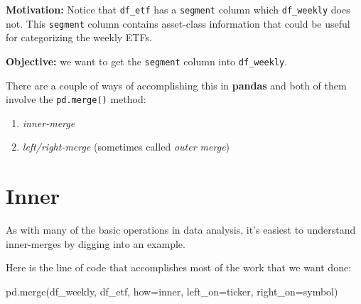 \documentclass[
  letterpaper,
  DIV=11,
  numbers=noendperiod]{scrreprt}
\newenvironment{Shaded}{\begin{snugshade}}{\end{snugshade}}
\newcommand{\NormalTok}[1]{\textcolor[rgb]{0.00,0.23,0.31}{#1}}
\newcommand{\OperatorTok}[1]{\textcolor[rgb]{0.37,0.37,0.37}{#1}}
\newcommand{\StringTok}[1]{\textcolor[rgb]{0.13,0.47,0.30}{#1}}
\begin{document}
\textbf{Motivation:} Notice that \texttt{df\_etf} has a \texttt{segment}
column which \texttt{df\_weekly} does not. This \texttt{segment} column
contains asset-class information that could be useful for categorizing
the weekly ETFs.

\textbf{Objective:} we want to get the \texttt{segment} column into
\texttt{df\_weekly}.

There are a couple of ways of accomplishing this in \textbf{pandas} and
both of them involve the \texttt{pd.merge()} method:

\begin{enumerate}
\def\labelenumi{\arabic{enumi}.}
\item
  \emph{inner-merge}
\item
  \emph{left/right-merge} (sometimes called \emph{outer merge})
\end{enumerate}

\hypertarget{inner}{%
\section{Inner}\label{inner}}

As with many of the basic operations in data analysis, it's easiest to
understand inner-merges by digging into an example.

Here is the line of code that accomplishes most of the work that we want
done:

\begin{Shaded}
\begin{Highlighting}[]
\NormalTok{pd.merge(df\_weekly, df\_etf, how}\OperatorTok{=}\StringTok{\textquotesingle{}inner\textquotesingle{}}\NormalTok{, left\_on}\OperatorTok{=}\StringTok{\textquotesingle{}ticker\textquotesingle{}}\NormalTok{, right\_on}\OperatorTok{=}\StringTok{\textquotesingle{}symbol\textquotesingle{}}\NormalTok{)}
\end{Highlighting}
\end{Shaded}
\end{document}
